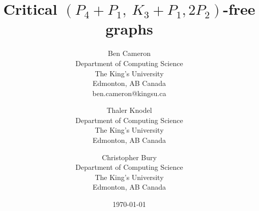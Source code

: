 \documentclass[11pt]{article}
\theoremstyle{definition}
\newcommand{\forbid}{$(P_4+P_1,\ K_3+P_1,2P_2)$}
\begin{document}
\title{Critical \forbid -free graphs}
\author{
Ben Cameron\\ %
\small Department of Computing Science\\
\small The King's University\\
\small Edmonton, AB Canada\\
\small ben.cameron@kingsu.ca\\
\and
Thaler Knodel\\ %
\small Department of Computing Science\\
\small The King's University\\
\small Edmonton, AB Canada\\
\and
Christopher Bury\\ %
\small Department of Computing Science\\
\small The King's University\\
\small Edmonton, AB Canada\\
}

\date{\today}

\maketitle
\end{document}
